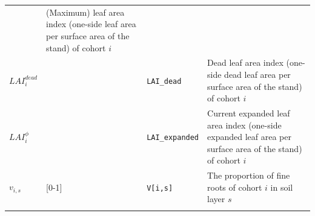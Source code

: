 \documentclass[]{book}
\begin{document}
\begin{longtable}[]{@{}llll@{}}
\begin{minipage}[t]{0.12\columnwidth}
\end{minipage} & \begin{minipage}[t]{0.45\columnwidth}\raggedright
(Maximum) leaf area index (one-side leaf area per surface area of the stand) of cohort \(i\)\strut
\end{minipage}\tabularnewline
\begin{minipage}[t]{0.11\columnwidth}\raggedright
\(LAI^{dead}_i\)\strut
\end{minipage} & \begin{minipage}[t]{0.10\columnwidth}\raggedright
\strut
\end{minipage} & \begin{minipage}[t]{0.12\columnwidth}\raggedright
\texttt{LAI\_dead}\strut
\end{minipage} & \begin{minipage}[t]{0.45\columnwidth}\raggedright
Dead leaf area index (one-side dead leaf area per surface area of the stand) of cohort \(i\)\strut
\end{minipage}\tabularnewline
\begin{minipage}[t]{0.11\columnwidth}\raggedright
\(LAI^{\phi}_i\)\strut
\end{minipage} & \begin{minipage}[t]{0.10\columnwidth}\raggedright
\strut
\end{minipage} & \begin{minipage}[t]{0.12\columnwidth}\raggedright
\texttt{LAI\_expanded}\strut
\end{minipage} & \begin{minipage}[t]{0.45\columnwidth}\raggedright
Current expanded leaf area index (one-side expanded leaf area per surface area of the stand) of cohort \(i\)\strut
\end{minipage}\tabularnewline
\begin{minipage}[t]{0.11\columnwidth}\raggedright
\(v_{i,s}\)\strut
\end{minipage} & \begin{minipage}[t]{0.10\columnwidth}\raggedright
{[}0-1{]}\strut
\end{minipage} & \begin{minipage}[t]{0.12\columnwidth}\raggedright
\texttt{V{[}i,s{]}}\strut
\end{minipage} & \begin{minipage}[t]{0.45\columnwidth}\raggedright
The proportion of fine roots of cohort \(i\) in soil layer \(s\)\strut
\end{minipage}\tabularnewline
\begin{minipage}[t]{0.11\columnwidth}\raggedright

\end{minipage}
\end{longtable}
\end{document}

